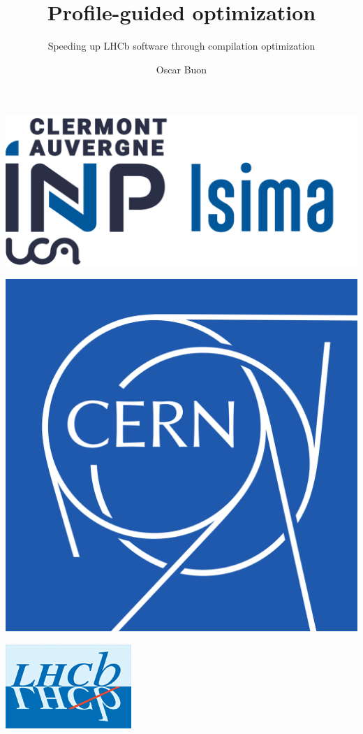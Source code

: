 \documentclass{beamer}
\title{Profile-guided optimization}
\subtitle{Speeding up LHCb software through compilation optimization}
\author{Oscar Buon}
\begin{document}
\begin{frame}
    \centering
    \begin{minipage}{0.2\textwidth}
        \includegraphics[width=\textwidth]{logo_ISIMA_INP.png}
    \end{minipage}\hfill
    \begin{minipage}{0.2\textwidth}
        \includegraphics[width=\textwidth]{logo_CERN.png}
    \end{minipage}\hfill
    \begin{minipage}{0.2\textwidth}
        \includegraphics[width=\textwidth]{logo_LHCb.png}
    \end{minipage}


\end{frame}
\end{document}
